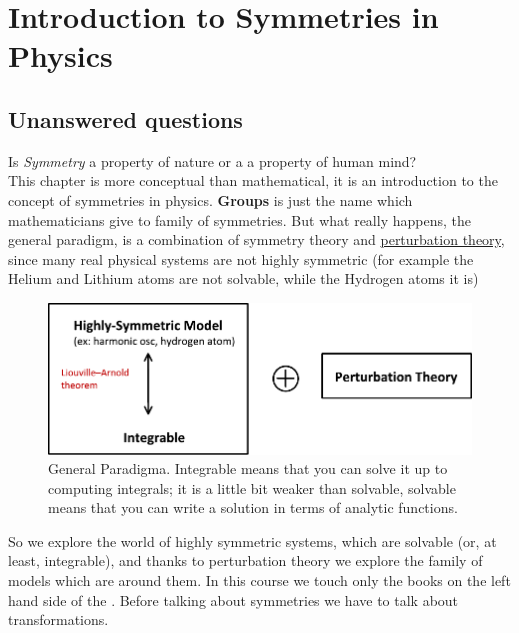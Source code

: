 \documentclass[../main.tex]{subfiles}
\begin{document}
\setchapterpreamble[u]{\margintoc}
\chapter[Introduction to Symmetries in Physics]{Introduction to Symmetries in Physics\footnotemark[0]}

\section{Unanswered questions}
Is \textit{Symmetry} a property of nature or a a property of human mind?\\
This chapter is more conceptual than mathematical, it is an introduction to the concept of symmetries in physics. \textbf{Groups} is just the name which mathematicians give to family of symmetries. But what really happens, the general paradigm, is a combination of symmetry theory and \href{https://en.wikipedia.org/wiki/Perturbation_theory}{perturbation theory}, since many real physical systems are not highly symmetric (for example the Helium and Lithium atoms are not solvable, while the Hydrogen atoms it is)
\begin{figure}[H]
	\includegraphics[width=1\textwidth]{images/General_Paradigm.pdf}
	\caption[General Paradigma]{General Paradigma. Integrable means that you can solve it up to computing integrals; it is a little bit weaker than solvable, solvable means that you can write a solution in terms of analytic functions.}
\end{figure}
So we explore the world of highly symmetric systems, which are solvable (or, at least, integrable), and thanks to perturbation theory we explore the family of models which are around them. In this course we touch only the books on the left hand side of the . Before talking about symmetries we have to talk about transformations.
\end{document}
